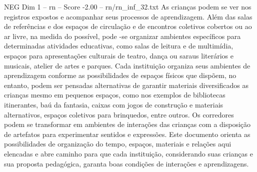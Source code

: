 \begin{textsample}{NEG Dim 1 – rn – Score -2.00 – rn/rn\_inf\_32.txt}
As crianças podem se ver nos registros expostos e acompanhar seus processos de aprendizagem.
Além das salas de referências e dos espaços de circulação e de encontros coletivos cobertos ou ao ar livre, na medida do possível, pode -se organizar ambientes específicos para determinadas atividades educativas, como salas de leitura e de multimídia, espaços para apresentações culturais de teatro, dança ou saraus literários e musicais, atelier de artes e parques.
Cada instituição organiza seus ambientes de aprendizagem conforme as possibilidades de espaços físicos que dispõem, no entanto, podem ser pensadas alternativas de garantir materiais diversificados as crianças mesmo em pequenos espaços, como nos exemplos de bibliotecas itinerantes, baú da fantasia, caixas com jogos de construção e materiais alternativos, espaços coletivos para brinquedos, entre outros.
Os corredores podem se transformar em ambientes de interações das crianças com a disposição de artefatos para experimentar sentidos e expressões.
Este documento orienta as possibilidades de organização do tempo, espaços, materiais e relações aqui elencadas e abre caminho para que cada instituição, considerando suas crianças e sua proposta pedagógica, garanta boas condições de interações e aprendizagens.

\end{textsample}

